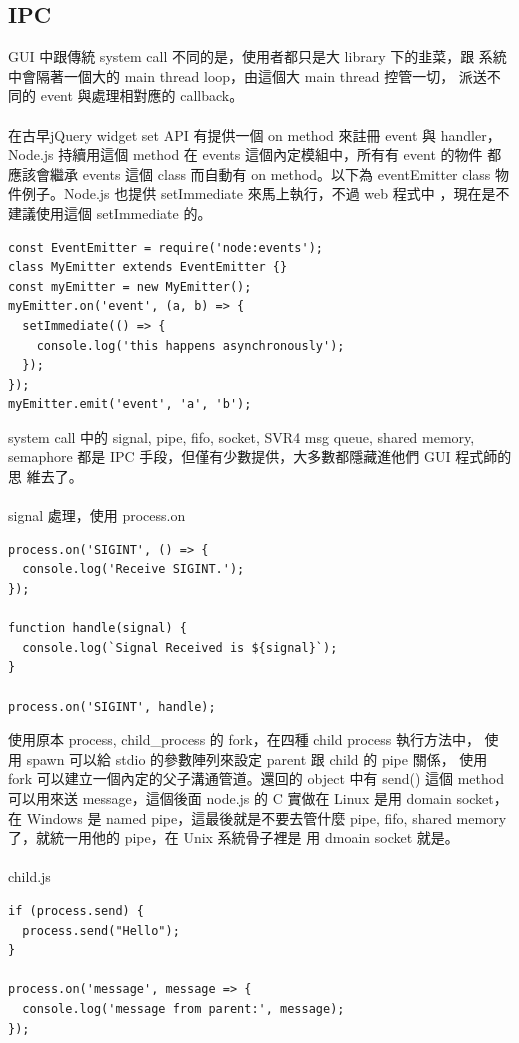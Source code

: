   \subsection{IPC}
  GUI 中跟傳統 system call 不同的是，使用者都只是大 library 下的韭菜，跟
  系統中會隔著一個大的 main thread loop，由這個大 main thread 控管一切，
  派送不同的 event 與處理相對應的 callback。
  \\\\
  在古早jQuery widget set API 有提供一個 on method 來註冊 event 與 handler，
  Node.js 持續用這個 method 在 events 這個內定模組中，所有有 event 的物件
  都應該會繼承 events 這個 class 而自動有 on method。以下為 eventEmitter
  class 物件例子。Node.js 也提供 setImmediate 來馬上執行，不過 web 程式中
  ，現在是不建議使用這個 setImmediate 的。
  \begin{verbatim}
const EventEmitter = require('node:events');
class MyEmitter extends EventEmitter {}
const myEmitter = new MyEmitter();
myEmitter.on('event', (a, b) => {
  setImmediate(() => {
    console.log('this happens asynchronously');
  });
});
myEmitter.emit('event', 'a', 'b');
  \end{verbatim}
  system call 中的 signal, pipe, fifo, socket, SVR4 msg queue, shared memory,
  semaphore 都是 IPC 手段，但僅有少數提供，大多數都隱藏進他們 GUI 程式師的思
  維去了。
  \\\\
  signal 處理，使用 process.on
  \begin{verbatim}
process.on('SIGINT', () => {
  console.log('Receive SIGINT.');
});
 
function handle(signal) {
  console.log(`Signal Received is ${signal}`);
}
 
process.on('SIGINT', handle);
  \end{verbatim}
  使用原本 process, child\_process 的 fork，在四種 child process 執行方法中，
  使用 spawn 可以給 stdio 的參數陣列來設定 parent 跟 child 的 pipe 關係，
  使用 fork 可以建立一個內定的父子溝通管道。還回的 object 中有 send()
  這個 method 可以用來送 message，這個後面 node.js 的 C 實做在 Linux
  是用 domain socket，在 Windows 是 named pipe，這最後就是不要去管什麼
  pipe, fifo, shared memory 了，就統一用他的 pipe，在 Unix 系統骨子裡是
  用 dmoain socket 就是。
  \\\\
  child.js
  \begin{verbatim}
if (process.send) {
  process.send("Hello");
}

process.on('message', message => {
  console.log('message from parent:', message);
});
  \end{verbatim}
